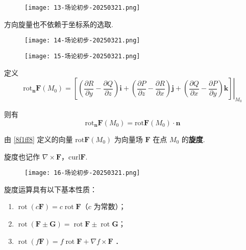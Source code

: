 \begin{figure}[H]
\centering
\texttt{[image: 13-场论初步-20250321.png]}
\label{}
\end{figure}

方向旋量也不依赖于坐标系的选取.

\begin{figure}[H]
\centering
\texttt{[image: 14-场论初步-20250321.png]}
\label{}
\end{figure}

\begin{figure}[H]
\centering
\texttt{[image: 15-场论初步-20250321.png]}
\label{}
\end{figure}

定义
\begin{equation}
\mathrm{rot}_{\boldsymbol{n}}\boldsymbol{F}(M_0)=\left.\left[ \left( \frac{ \partial R }{ \partial y } -\frac{ \partial Q }{ \partial z }  \right)\boldsymbol{i}+\left( \frac{ \partial P }{ \partial z } -\frac{ \partial R }{ \partial x }  \right)\boldsymbol{j}+\left( \frac{ \partial Q }{ \partial x } -\frac{ \partial P }{ \partial y }  \right)\boldsymbol{k} \right]\right|_{M_0}
\label{8f1ff8}
\end{equation}

则有
\[
\mathrm{rot}_{\boldsymbol{n}}\boldsymbol{F}(M_0)=\mathrm{rot}\boldsymbol{F}(M_0)\cdot \boldsymbol{n}
\]
\begin{definition}[旋度]
由 \cref{8f1ff8} 定义的向量 $\mathrm{rot}\boldsymbol{F}(M_0)$ 为向量场 $\boldsymbol{F}$ 在点 $M_0$ 的\textbf{旋度}.
\end{definition}
旋度也记作 $\nabla \times \boldsymbol{F}$，$\mathrm{curl}\boldsymbol{F}$.

\begin{figure}[H]
\centering
\texttt{[image: 16-场论初步-20250321.png]}
\label{}
\end{figure}

旋度运算具有以下基本性质：

\begin{enumerate}
	\item $\operatorname{rot}(c \boldsymbol{F})=c \operatorname{rot} \boldsymbol{F}$（$c$ 为常数）；
	\item $\operatorname{rot}(\boldsymbol{F} \pm \boldsymbol{G})=\operatorname{rot} \boldsymbol{F} \pm \operatorname{rot} \boldsymbol{G}$；
	\item $\operatorname{rot}(f \boldsymbol{F})=f \operatorname{rot} \boldsymbol{F}+\nabla f \times \boldsymbol{F}$ ．
\end{enumerate}

